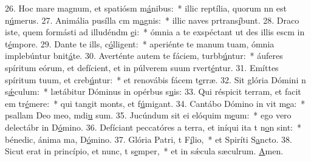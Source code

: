 26. Hoc mare magnum, et spatiósm m\uline{á}nibus:~* illic reptília, quorum nn est n\uline{ú}merus.
27. Animália pusílla cm m\uline{a}gnis:~* illic naves prtrans\uline{í}bunt.
28. Draco iste, quem formásti ad illudéndm \uline{e}i:~* ómnia a te exspéctant ut des illis escm in t\uline{é}mpore.
29. Dante te ills, c\uline{ó}lligent:~* aperiénte te manum tuam, ómnia implebúntur bnit\uline{á}te.
30. Averténte autem te fáciem, turbb\uline{ú}ntur:~* áuferes spíritum eórum, et defícient, et in púlverem suum rvert\uline{é}ntur.
31. Emíttes spíritum tuum, et creb\uline{ú}ntur:~* et renovábis fácem t\uline{e}rræ.
32. Sit glória Dómini n s\uline{ǽ}culum:~* lætábitur Dóminus in opérbus s\uline{u}is:
33. Qui réspicit terram, et facit em tr\uline{é}mere:~* qui tangit monts, et f\uline{ú}migant.
34. Cantábo Dómino in vit m\uline{e}a:~* psallam Deo meo, mdi\uline{u} sum.
35. Jucúndum sit ei elóquim m\uline{e}um:~* ego vero delectábr in D\uline{ó}mino.
36. Defíciant peccatóres a terra, et iníqui ita t n\uline{o}n sint:~* bénedic, ánima ma, D\uline{ó}mino.
37. Glória Patri, t F\uline{í}lio,~* et Spiríti S\uline{a}ncto.
38. Sicut erat in princípio, et nunc, t s\uline{e}mper,~* et in sǽcula sæculrum. \uline{A}men.
